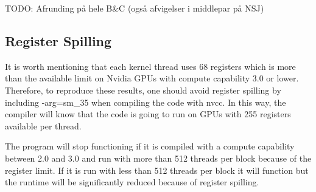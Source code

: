 TODO:
Afrunding på hele B\&C (også afvigelser i middlepar på NSJ)

\subsection{Register Spilling}
It is worth mentioning that each kernel thread uses 68 registers which is more than the available limit on Nvidia GPUs with compute capability 3.0 or lower. Therefore, to reproduce these results, one should avoid register spilling by including -arg=sm\_35 when compiling the code with nvcc. In this way, the compiler will know that the code is going to run on GPUs with 255 registers available per thread. 

The program will stop functioning if it is compiled with a compute capability between 2.0 and 3.0 and run with more than 512 threads per block because of the register limit. If it is run with less than 512 threads per block it will function but the runtime will be significantly reduced because of register spilling. 